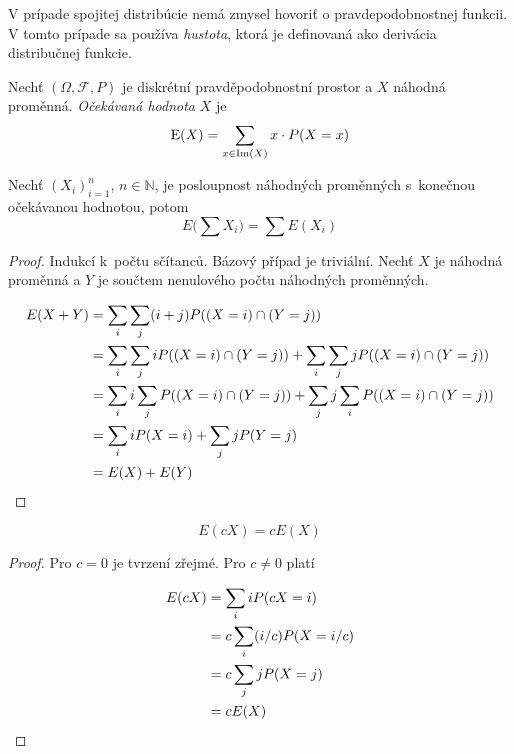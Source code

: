 V prípade spojitej distribúcie nemá zmysel hovoriť o pravdepodobnostnej
funkcii. V tomto prípade sa používa {\em hustota}, ktorá je definovaná
ako derivácia distribučnej funkcie.

\begin{definition}
    Nechť $(\Omega, \mathcal{F}, P)$ je diskrétní pravděpodobnostní
    prostor a $X$ náhodná proměnná. {\em Očekávaná hodnota} $X$
    je
    \[ \operatorname{E}(X) = \sum_{x \in \operatorname{Im}(X)} x \cdot P(X = x) \]
\end{definition}

\begin{theorem}
    Nechť $(X_i)_{i=1}^{n}$, $n \in \mathbb{N}$, je posloupnost
    náhodných proměnných \linebreak s~konečnou očekávanou hodnotou, potom
    \[
        E \big ( \sum X_i \big ) = \sum E(X_i)
    \]
\end{theorem}

\begin{proof}
    Indukcí k~počtu sčítanců. Bázový případ je triviální. Nechť $X$ je
    náhodná proměnná a $Y$ je součtem nenulového počtu náhodných proměnných.

    \begin{align*}
        E(X + Y) &= \sum_i \sum_j (i+j) P((X = i) \cap (Y = j)) \\
                 &= \sum_i \sum_j i P((X = i) \cap (Y = j))
                  + \sum_i \sum_j j P((X = i) \cap (Y = j)) \\
                 &= \sum_i i \sum_j P((X = i) \cap (Y = j))
                  + \sum_j j \sum_i P((X = i) \cap (Y = j)) \\
                 &= \sum_i i P(X = i)
                  + \sum_j j P(Y = j) \\
                 &= E(X) + E(Y)
                   \qedhere
    \end{align*}
\end{proof}

\begin{theorem}
    \[
        E(cX) = cE(X)
    \]
\end{theorem}

\begin{proof}
    Pro $c = 0$ je tvrzení zřejmé. Pro $c \neq 0$ platí

    \begin{align*}
        E(cX) &=   \sum_i i P(cX = i) \\
              &= c \sum_i (i/c) P(X = i/c) \\
              &= c \sum_j j P(X = j) \\
              &= c E(X)
                \qedhere
    \end{align*}
\end{proof}

